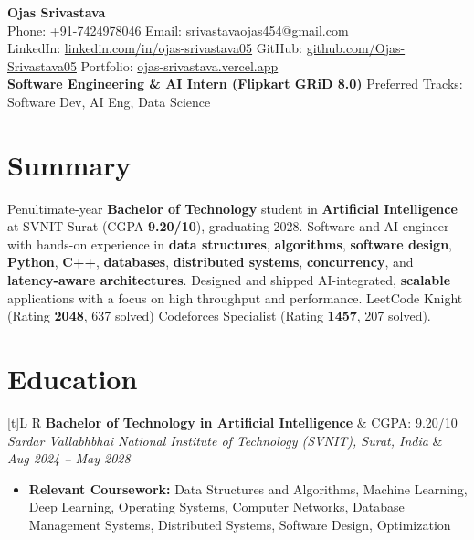 \documentclass[a4paper,10pt]{article}
\newcommand{\resumeSubheading}[4]{
  \vspace{0.5mm}
  \noindent
  \begin{tabularx}{\textwidth}[t]{L R}
    \textbf{#1} & #4 \\
    \textit{#3} & \textit{#2} \\
  \end{tabularx}
  \vspace{-0.5mm}
}
\begin{document}
\selectfont

\begin{center}
  {\LARGE \textbf{Ojas Srivastava}} \\[1mm]
  \small
  Phone: +91-7424978046 \textbar{}
  Email: \href{mailto:srivastavaojas454@gmail.com}{srivastavaojas454@gmail.com} \\[0.5mm]
  LinkedIn: \href{https://linkedin.com/in/ojas-srivastava05}{linkedin.com/in/ojas-srivastava05} \textbar{}
  GitHub: \href{https://github.com/Ojas-Srivastava05}{github.com/Ojas-Srivastava05} \textbar{}
  Portfolio: \href{https://ojas-srivastava.vercel.app}{ojas-srivastava.vercel.app} \\[0.5mm]
  \textbf{Software Engineering \& AI Intern (Flipkart GRiD 8.0)} \textbar{}
  Preferred Tracks: Software Dev, AI Eng, Data Science
\end{center}

\vspace{-1mm}

\section{Summary}
\small
Penultimate-year \textbf{Bachelor of Technology} student in \textbf{Artificial Intelligence} at SVNIT Surat (CGPA \textbf{9.20/10}), graduating 2028. Software and AI engineer with hands-on experience in \textbf{data structures}, \textbf{algorithms}, \textbf{software design}, \textbf{Python}, \textbf{C++}, \textbf{databases}, \textbf{distributed systems}, \textbf{concurrency}, and \textbf{latency-aware architectures}. Designed and shipped AI-integrated, \textbf{scalable} applications with a focus on high throughput and performance. LeetCode Knight (Rating \textbf{2048}, 637 solved) \textbar{} Codeforces Specialist (Rating \textbf{1457}, 207 solved).

\section{Education}
\small
\resumeSubheading
  {Bachelor of Technology in Artificial Intelligence}{Aug 2024 -- May 2028}
  {Sardar Vallabhbhai National Institute of Technology (SVNIT), Surat, India}{CGPA: 9.20/10}
\begin{itemize}
  \item \textbf{Relevant Coursework:} Data Structures and Algorithms, Machine Learning, Deep Learning, Operating Systems, Computer Networks, Database Management Systems, Distributed Systems, Software Design, Optimization
\end{itemize}
\end{document}
